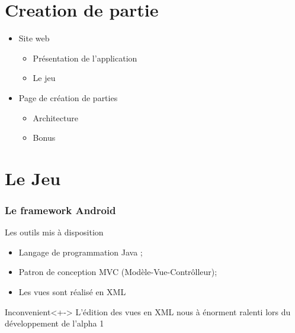 \documentclass{beamer}
\def\android{Android\texttrademark}
\begin{document}
\section{Creation de partie}

\begin{frame}
  \begin{itemize}
  \item Site web
    \begin{itemize}
    \item Présentation de l'application
    \item Le jeu
    \end{itemize}
  \item Page de création de parties
    \begin{itemize}
    \item Architecture
    \item Bonus
    \end{itemize}
  \end{itemize}
\end{frame}

\section{Le Jeu}

\begin{frame}
\frametitle{Le framework \android{}}
\begin{block}{Les outils mis à disposition}
  \begin{itemize}
    \item<+-> Langage de programmation Java ;
    \item<+-> Patron de conception MVC (Modèle-Vue-Contrôlleur);
    \item<+-> Les vues sont réalisé en XML
  \end{itemize}
\end{block}
\begin{alertblock}{Inconvenient}<+->
  L'édition des vues en XML nous à énorment ralenti lors du développement de l'alpha 1
\end{alertblock}
\end{frame}
\end{document}
